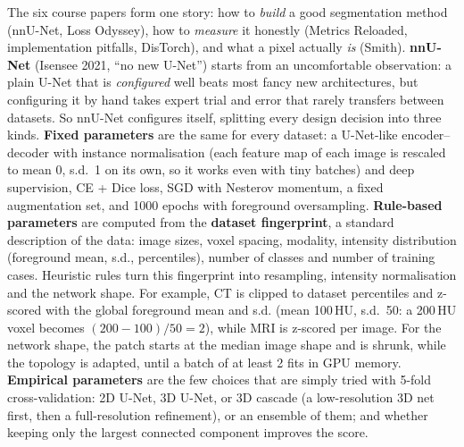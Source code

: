 \documentclass[a4paper]{article}
\newcommand{\K}[1]{\textcolor{kg}{\textbf{#1}}}
\newcommand{\E}[1]{\textcolor{ep}{#1}}
\begin{document}
The six course papers form one story: how to \emph{build} a good segmentation method (nnU-Net, Loss Odyssey), how to \emph{measure} it honestly (Metrics Reloaded, implementation pitfalls, DisTorch), and what a pixel actually \emph{is} (Smith). \K{nnU-Net} (Isensee 2021, ``no new U-Net'') starts from an uncomfortable observation: a plain U-Net that is \emph{configured} well beats most fancy new architectures, but configuring it by hand takes expert trial and error that rarely transfers between datasets. So nnU-Net configures itself, splitting every design decision into three kinds. \K{Fixed parameters} are the same for every dataset: a U-Net-like encoder--decoder with instance normalisation (each feature map of each image is rescaled to mean 0, s.d.\ 1 on its own, so it works even with tiny batches) and deep supervision, CE + Dice loss, SGD with Nesterov momentum, a fixed augmentation set, and 1000 epochs with foreground oversampling. \K{Rule-based parameters} are computed from the \K{dataset fingerprint}, a standard description of the data: image sizes, voxel spacing, modality, intensity distribution (foreground mean, s.d., percentiles), number of classes and number of training cases. Heuristic rules turn this fingerprint into resampling, intensity normalisation and the network shape. For example, CT is clipped to dataset percentiles and z-scored with the global foreground mean and s.d. (\E{mean 100\,HU, s.d.\ 50: a 200\,HU voxel becomes $(200-100)/50=2$}), while MRI is z-scored per image. For the network shape, the patch starts at the median image shape and is shrunk, while the topology is adapted, until a batch of at least 2 fits in GPU memory. \K{Empirical parameters} are the few choices that are simply tried with 5-fold cross-validation: 2D U-Net, 3D U-Net, or 3D cascade (a low-resolution 3D net first, then a full-resolution refinement), or an ensemble of them; and whether keeping only the largest connected component improves the score.
\end{document}
